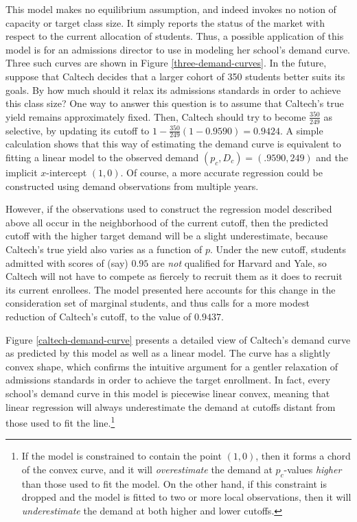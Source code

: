 \documentclass[12pt]{article}
\theoremstyle{definition}
\begin{document}
This model makes no equilibrium assumption, and indeed invokes no notion of capacity or target class size. It simply reports the status of the market with respect to the current allocation of students. Thus, a possible application of this model is for an admissions director to use in modeling her school's demand curve. Three such curves are shown in Figure \ref{three-demand-curves}. In the future, suppose that Caltech decides that a larger cohort of 350 students better suits its goals. By how much should it relax its admissions standards in order to achieve this class size? One way to answer this question is to assume that Caltech’s true yield remains approximately fixed. Then, Caltech should try to become $\frac{350}{249}$ as selective, by updating its cutoff to $1 - \frac{350}{249}(1 - 0.9590) = 0.9424$. A simple calculation shows that this way of estimating the demand curve is equivalent to fitting a linear model to the observed demand $(p_c, D_c) = (.9590, 249)$ and the implicit $x$-intercept $(1, 0)$. Of course, a more accurate regression could be constructed using demand observations from multiple years. 

However, if the observations used to construct the regression model described above all occur in the neighborhood of the current cutoff, then the predicted cutoff with the higher target demand will be a slight underestimate, because Caltech’s true yield also varies as a function of $p$. Under the new cutoff, students admitted with scores of (say) $0.95$ are \emph{not} qualified for Harvard and Yale, so Caltech will not have to compete as fiercely to recruit them as it does to recruit its current enrollees. The model presented here accounts for this change in the consideration set of marginal students, and thus calls for a more modest reduction of Caltech’s cutoff, to the value of $0.9437$.

Figure \ref{caltech-demand-curve} presents a detailed view of Caltech’s demand curve as predicted by this model as well as a linear model. The curve has a slightly convex shape, which confirms the intuitive argument for a gentler relaxation of admissions standards in order to achieve the target enrollment. In fact, every school’s demand curve in this model is piecewise linear convex, meaning that linear regression will always underestimate the demand at cutoffs distant from those used to fit the line.\footnote{If the model is constrained to contain the point $(1, 0)$, then it forms a chord of the convex curve, and it will \emph{overestimate} the demand at $p_c$-values \emph{higher} than those used to fit the model. On the other hand, if this constraint is dropped and the model is fitted to two or more local observations, then it will \emph{underestimate} the demand at both higher and lower cutoffs.}
\end{document}
